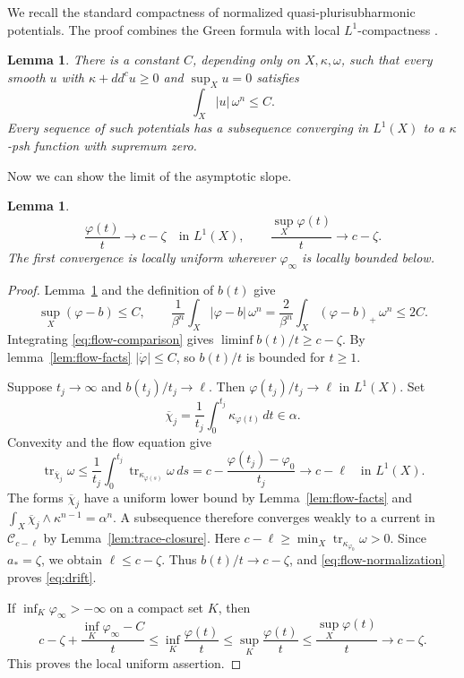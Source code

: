 \documentclass[reqno]{amsart}
\numberwithin{equation}{section}
\newtheorem{lemma}[theorem]{Lemma}
\theoremstyle{definition}
\DeclareMathOperator{\tr}{tr}
\begin{document}
We recall the standard compactness of normalized
quasi-plurisubharmonic potentials. The proof combines the
Green formula with local $L^1$-compactness
\cite[Chapter~I, Proposition~4.21]{D12}.
\begin{lemma}
\label{lem:normalized-potentials}
There is a constant $C$, depending only on $X,\kappa,\omega$, such
that every smooth $u$ with
$\kappa+dd^cu\ge0$ and $\sup_Xu=0$ satisfies
\begin{equation}\label{eq:potential-integral}
 \int_X|u|\,\omega^n\le C.
\end{equation}
Every sequence of such potentials has a subsequence converging in
$L^1(X)$ to a $\kappa$-psh function with supremum zero.
\end{lemma}
Now we can show the limit of the asymptotic slope. 
\begin{lemma}\label{lem:drift}
\begin{equation}\label{eq:drift}
 \frac{\varphi(t)}t\longrightarrow c-\zeta\quad\text{in }L^1(X),
 \qquad
 \frac{\sup_X\varphi(t)}t\longrightarrow c-\zeta.
\end{equation}
The first convergence is locally uniform wherever $\varphi_\infty$ is
locally bounded below.
\end{lemma}
\begin{proof}
Lemma~\ref{lem:normalized-potentials} and the definition of $b(t)$ give
\begin{equation}\label{eq:flow-normalization}
 \sup_X(\varphi-b)\le C,\qquad
 \frac1{\beta^n}\int_X|\varphi-b|\,\omega^n
 =\frac2{\beta^n}\int_X(\varphi-b)_+\,\omega^n\le2C.
\end{equation}
Integrating \eqref{eq:flow-comparison} gives
$\liminf b(t)/t\ge c-\zeta$. By lemma~\ref{lem:flow-facts}
$|\dot\varphi|\le C$, so $b(t)/t$ is bounded for $t\ge1$.

Suppose $t_j\to\infty$ and $b(t_j)/t_j\to\ell$. Then
$\varphi(t_j)/t_j\to\ell$ in $L^1(X)$. Set
\[
 \overline\chi_j=\frac1{t_j}\int_0^{t_j}
                   \kappa_{\varphi(t)}\,dt\in\alpha.
\]
Convexity and the flow equation give
\begin{equation}\label{eq:average-trace}
 \tr_{\overline\chi_j}\omega
 \le\frac1{t_j}\int_0^{t_j}
          \tr_{\kappa_{\varphi(s)}}\omega\,ds
 =c-\frac{\varphi(t_j)-\varphi_0}{t_j}
 \longrightarrow c-\ell\quad\text{in }L^1(X).
\end{equation}
The forms $\overline\chi_j$ have a uniform lower bound by Lemma~\ref{lem:flow-facts} and
$\int_X\overline\chi_j\wedge\kappa^{n-1}=\alpha^n$. A subsequence
therefore converges weakly to a current in $\mathcal C_{c-\ell}$ by
Lemma~\ref{lem:trace-closure}. Here
$c-\ell\ge\min_X\tr_{\kappa_{\varphi_0}}\omega>0$.
Since $a_*=\zeta$, we obtain $\ell\le c-\zeta$. Thus
$b(t)/t\to c-\zeta$, and \eqref{eq:flow-normalization} proves
\eqref{eq:drift}.

If $\inf_K\varphi_\infty>-\infty$ on a compact set $K$, then
\[
 c-\zeta+\frac{\inf_K\varphi_\infty-C}{t}
 \le\inf_K\frac{\varphi(t)}t
 \le\sup_K\frac{\varphi(t)}t
 \le\frac{\sup_X\varphi(t)}t\longrightarrow c-\zeta.
\]
This proves the local uniform assertion.
\end{proof}
\end{document}
